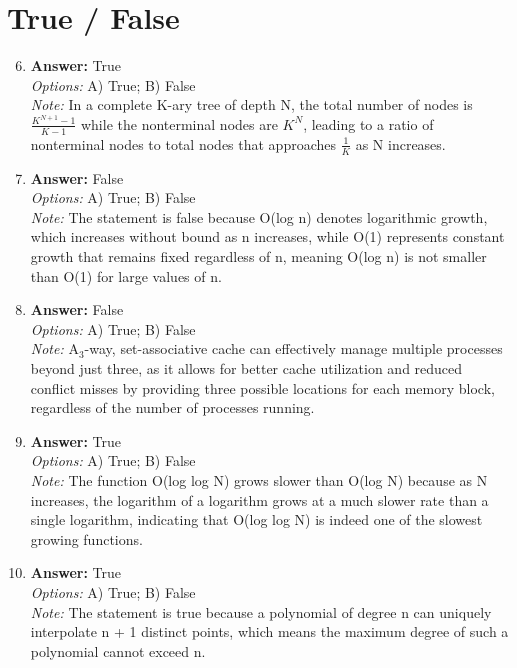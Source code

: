 \documentclass[12pt]{article}
\begin{document}
\section*{True / False}
\begin{enumerate}[label=\arabic*.]
\setcounter{enumi}{5}
\item \textbf{Answer:} True
\\ \textit{Options:} A) True; B) False
\\ \textit{Note:} In a complete K-ary tree of depth N, the total number of nodes is \( \frac{K^{N+1} - 1}{K - 1} \) while the nonterminal nodes are \( K^N \), leading to a ratio of nonterminal nodes to total nodes that approaches \( \frac{1}{K} \) as N increases.
\item \textbf{Answer:} False
\\ \textit{Options:} A) True; B) False
\\ \textit{Note:} The statement is false because O(log n) denotes logarithmic growth, which increases without bound as n increases, while O(1) represents constant growth that remains fixed regardless of n, meaning O(log n) is not smaller than O(1) for large values of n.
\item \textbf{Answer:} False
\\ \textit{Options:} A) True; B) False
\\ \textit{Note:} A$_{3}$-way, set-associative cache can effectively manage multiple processes beyond just three, as it allows for better cache utilization and reduced conflict misses by providing three possible locations for each memory block, regardless of the number of processes running.
\item \textbf{Answer:} True
\\ \textit{Options:} A) True; B) False
\\ \textit{Note:} The function O(log log N) grows slower than O(log N) because as N increases, the logarithm of a logarithm grows at a much slower rate than a single logarithm, indicating that O(log log N) is indeed one of the slowest growing functions.
\item \textbf{Answer:} True
\\ \textit{Options:} A) True; B) False
\\ \textit{Note:} The statement is true because a polynomial of degree n can uniquely interpolate n + 1 distinct points, which means the maximum degree of such a polynomial cannot exceed n.
\end{enumerate}
\end{document}
